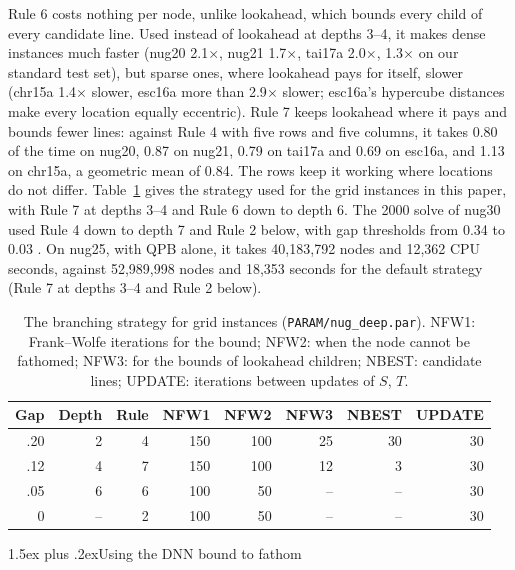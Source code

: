 \documentclass[10pt]{article}
\makeatletter
\renewcommand\subsection{\@startsection{subsection}{2}{\z@}{-3.25ex plus -1ex minus -.2ex}%
  {1.5ex plus .2ex}{\normalfont\normalsize\bfseries}}
\theoremstyle{remark}
\makeatother
\begin{document}
Rule 6 costs nothing per node, unlike lookahead, which bounds every child of every
candidate line. Used instead of lookahead at depths 3--4, it makes dense instances
much faster (nug20 2.1$\times$, nug21 1.7$\times$, tai17a 2.0$\times$, 1.3$\times$
on our standard test set), but sparse ones, where lookahead pays for itself, slower (chr15a 1.4$\times$ slower, esc16a more than
2.9$\times$ slower; esc16a's hypercube distances make every location equally
eccentric). Rule 7 keeps lookahead where it pays and bounds fewer lines: against
Rule 4 with five rows and five columns, it takes 0.80 of the time on nug20, 0.87 on
nug21, 0.79 on tai17a and 0.69 on esc16a, and 1.13 on chr15a, a geometric mean of
0.84. The rows keep it working where locations do not differ. Table~\ref{tab:strategy}
gives the strategy used for the grid instances in this paper, with Rule 7 at
depths 3--4 and Rule 6 down to depth 6. The 2000 solve of nug30 used Rule 4 down to
depth 7 and Rule 2 below, with gap thresholds from 0.34 to 0.03
\cite[Table~5.11]{thesis}. On nug25, with QPB alone, it takes
40,183,792 nodes and 12,362 CPU seconds, against 52,989,998 nodes and 18,353 seconds
for the default strategy (Rule 7 at depths 3--4 and Rule 2 below).

\begin{table}[t]\centering
\caption{The branching strategy for grid instances (\texttt{PARAM/nug\_deep.par}).
NFW1: Frank--Wolfe iterations for the bound; NFW2: when the node cannot be
fathomed; NFW3: for the bounds of lookahead children; NBEST: candidate lines;
UPDATE: iterations between updates of $S$, $T$.}\label{tab:strategy}
\small
\begin{tabular}{rrrrrrrr}
\toprule
Gap & Depth & Rule & NFW1 & NFW2 & NFW3 & NBEST & UPDATE\\
\midrule
.20 & 2 & 4 & 150 & 100 & 25 & 30 & 30\\
.12 & 4 & 7 & 150 & 100 & 12 & 3 & 30\\
.05 & 6 & 6 & 100 & 50 & -- & -- & 30\\
0 & -- & 2 & 100 & 50 & -- & -- & 30\\
\bottomrule
\end{tabular}
\end{table}

\subsection{Using the DNN bound to fathom}\label{sec:fathom}
\end{document}
